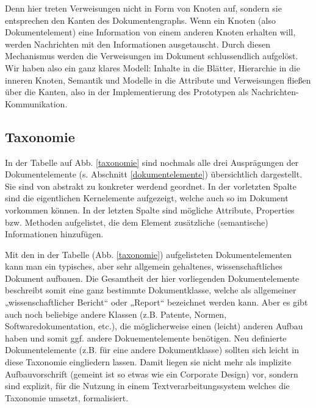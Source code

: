  
Denn hier treten Verweisungen nicht in Form von Knoten auf, sondern sie entsprechen den Kanten des Dokumentengraphs. Wenn ein Knoten (also Dokumentelement) eine Information von einem anderen Knoten erhalten will, werden Nachrichten mit den Informationen ausgetauscht. Durch diesen Mechanismus werden die Verweisungen im Dokument schlussendlich aufgelöst. Wir haben also ein ganz klares Modell: Inhalte in die Blätter, Hierarchie in die inneren Knoten, Semantik und Modelle in die Attribute und Verweisungen fließen über die Kanten, also in der Implementierung des Prototypen als Nachrichten-Kommunikation.

 
\subsection{Taxonomie}\label{taxonomiesec}
 
In der Tabelle auf Abb. \ref{taxonomie} sind nochmals alle drei Ausprägungen der Dokumentelemente (s. Abschnitt \ref{dokumentelemente}) übersichtlich dargestellt. Sie sind von abstrakt zu konkreter werdend geordnet. In der vorletzten Spalte sind die eigentlichen Kernelemente aufgezeigt, welche auch so im Dokument vorkommen können. In der letzten Spalte sind mögliche Attribute, Properties bzw. Methoden aufgelistet, die dem Element zusätzliche (semantische) Informationen hinzufügen.

 
Mit den in der Tabelle (Abb. \ref{taxonomie}) aufgelisteten Dokumentelementen kann man ein typisches, aber sehr allgemein gehaltenes, wissenschaftliches Dokument aufbauen. Die Gesamtheit der hier vorliegenden Dokumentelemente beschreibt somit eine ganz bestimmte Dokumentklasse, welche als allgemeiner „wissenschaftlicher Bericht“ oder „Report“ bezeichnet werden kann. Aber es gibt auch noch beliebige andere Klassen (z.B. Patente, Normen, Softwaredokumentation, etc.), die möglicherweise einen (leicht) anderen Aufbau haben und somit ggf. andere Dokuementelemente benötigen. Neu definierte Dokumentelemente (z.B. für eine andere Dokumentklasse) sollten sich leicht in diese Taxonomie eingliedern lassen. Damit liegen sie nicht mehr als implizite Aufbauvorschrift (gemeint ist so etwas wie ein Corporate Design) vor, sondern sind explizit, für die Nutzung in einem Textverarbeitungssystem welches die Taxonomie umsetzt, formalisiert.


